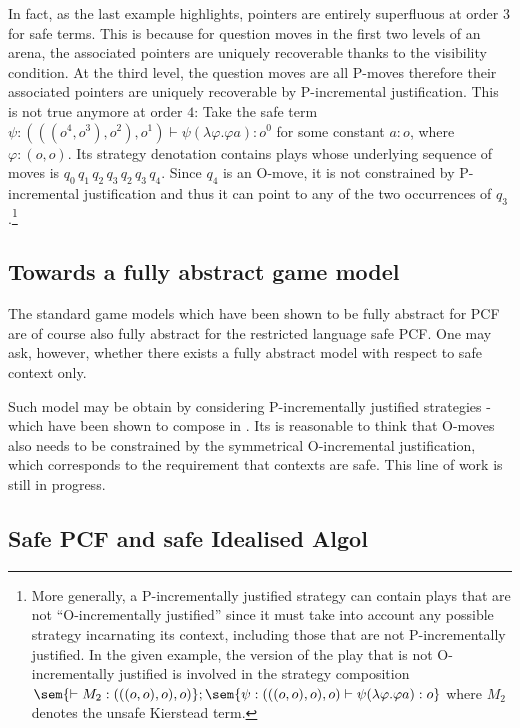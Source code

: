 In fact, as the last example highlights, pointers are entirely
superfluous at order $3$ for safe terms. This is because for
question moves in the first two levels of an arena, the associated
pointers are uniquely recoverable thanks to the visibility
condition. At the third level, the question moves are all P-moves
therefore their associated pointers are uniquely recoverable by
P-incremental justification. This is not true anymore at order $4$:
Take the safe term $\psi:(((o^4,o^3),o^2),o^1) \vdash \psi (\lambda
\varphi . \varphi a) : o^0$ for some constant $a:o$, where
$\varphi:(o,o)$. Its strategy denotation contains plays whose
underlying sequence of moves is $q_0 \, q_1 \, q_2 \, q_3 \, q_2 \,
q_3 \, q_4$. Since $q_4$ is an O-move, it is not constrained by
P-incremental justification and thus it can point to any of the two
occurrences of $q_3$.\footnote{More generally, a P-incrementally
justified strategy can contain plays that are not ``O-incrementally
justified'' since it must take into account any possible strategy
incarnating its context, including those that are not
P-incrementally justified. In the given example, the version of the
play that is not O-incrementally justified is involved in the
strategy composition $\sem{ \vdash M_2 : (((o,o),o),o)} ; \sem{
\psi:(((o,o),o),o) \vdash \psi (\lambda \varphi . \varphi a):o}$
where $M_2$ denotes the unsafe Kierstead term.}


\subsection*{Towards a fully abstract game model}\hfill

The standard game models which have been shown to be fully abstract
for PCF \cite{abramsky94full,hylandong_pcf} are of course also fully
abstract for the restricted language safe PCF. One may ask, however,
whether there exists a fully abstract model with respect to safe
context only.

Such model may be obtain by considering P-incrementally justified strategies
- which have been shown to compose in \cite{Blumphd}. Its is reasonable to think that
 O-moves also needs to be constrained by the symmetrical O-incremental justification, which corresponds to the requirement that contexts are safe. This line of work is still in progress.


\subsection*{Safe PCF and safe Idealised Algol}

